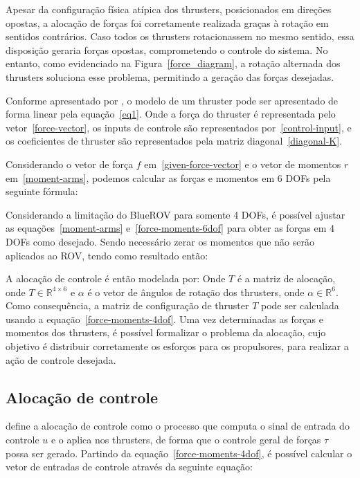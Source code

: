 \documentclass[../main.tex]{subfiles}
\begin{document}
Apesar da configuração física atípica dos thrusters, posicionados em direções opostas, a alocação de forças foi corretamente realizada graças à rotação em sentidos contrários. Caso todos os thrusters rotacionassem no mesmo sentido, essa disposição geraria forças opostas, comprometendo o controle do sistema. No entanto, como evidenciado na Figura~\ref{force_diagram}, a rotação alternada dos thrusters soluciona esse problema, permitindo a geração das forças desejadas.

Conforme apresentado por \cite{wu20186}, o modelo de um thruster pode ser apresentado de forma linear pela equação~\ref{eq1}. Onde a força do thruster é representada pelo vetor~\ref{force-vector}, os inputs de controle são representados por~\ref{control-input}, e os coeficientes de thruster são representados pela matriz diagonal~\ref{diagonal-K}.

\modelA
\vetorF
\vetorU
\vetorK

Considerando o vetor de força $f$ em~\ref{given-force-vector} e o vetor de momentos $r$ em~\ref{moment-arms}, podemos calcular as forças e momentos em 6 DOFs pela seguinte fórmula:
\vetorFmin
\vetorR
\modelB

Considerando a limitação do BlueROV para somente 4 DOFs, é possível ajustar as equações~\ref{moment-arms} e~\ref{force-moments-6dof} para obter as forças em 4 DOFs como desejado. Sendo necessário zerar os momentos que não serão aplicados ao ROV, tendo como resultado então:
\vetorRfour
\modelfourdofs

A alocação de controle é então modelada por:
\generalisedTau
Onde $T$ é a matriz de alocação, onde $T \in \mathbb{R}^{4 \times 6}$ e $\alpha$ é o vetor de ângulos de rotação dos thrusters, onde $\alpha \in \mathbb{R}^{6}$. Como consequência, a matriz de configuração de thruster $T$ pode ser calculada usando a equação~\ref{force-moments-4dof}. Uma vez determinadas as forças e momentos dos thrusters, é possível formalizar o problema da alocação, cujo objetivo é distribuir corretamente os esforços para os propulsores, para realizar a ação de controle desejada.

\subsection{Alocação de controle}

\cite{wu20186} define a alocação de controle como o processo que computa o sinal de entrada do controle $u$ e o aplica nos thrusters, de forma que o controle geral de forças $\tau$ possa ser gerado. Partindo da equação~\ref{force-moments-4dof}, é possível calcular o vetor de entradas de controle através da seguinte equação:
\controlinput
\end{document}
